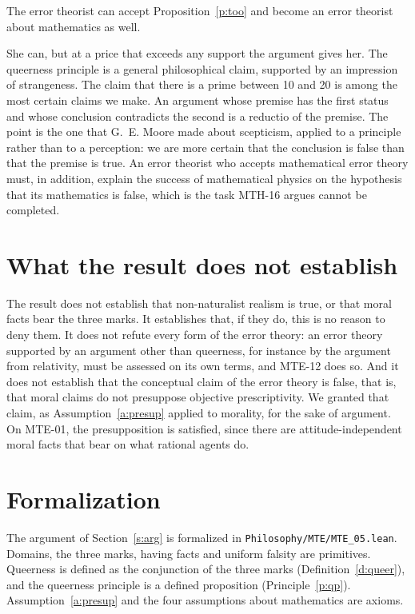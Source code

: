 \documentclass{situationist-preprint}
\begin{document}
\begin{objection}
The error theorist can accept Proposition~\ref{p:too} and become an error theorist about mathematics as well.
\end{objection}

\begin{reply}
She can, but at a price that exceeds any support the argument gives her. The queerness principle is a general philosophical claim, supported by an impression of strangeness. The claim that there is a prime between 10 and 20 is among the most certain claims we make. An argument whose premise has the first status and whose conclusion contradicts the second is a reductio of the premise. The point is the one that G.~E. Moore made about scepticism, applied to a principle rather than to a perception: we are more certain that the conclusion is false than that the premise is true. An error theorist who accepts mathematical error theory must, in addition, explain the success of mathematical physics on the hypothesis that its mathematics is false, which is the task MTH-16 argues cannot be completed.
\end{reply}

\section{What the result does not establish}

The result does not establish that non-naturalist realism is true, or that moral facts bear the three marks. It establishes that, if they do, this is no reason to deny them. It does not refute every form of the error theory: an error theory supported by an argument other than queerness, for instance by the argument from relativity, must be assessed on its own terms, and MTE-12 does so. And it does not establish that the conceptual claim of the error theory is false, that is, that moral claims do not presuppose objective prescriptivity. We granted that claim, as Assumption~\ref{a:presup} applied to morality, for the sake of argument. On MTE-01, the presupposition is satisfied, since there are attitude-independent moral facts that bear on what rational agents do.

\section{Formalization}

The argument of Section~\ref{s:arg} is formalized in \nolinkurl{Philosophy/MTE/MTE_05.lean}. Domains, the three marks, having facts and uniform falsity are primitives. Queerness is defined as the conjunction of the three marks (Definition~\ref{d:queer}), and the queerness principle is a defined proposition (Principle~\ref{p:qp}). Assumption~\ref{a:presup} and the four assumptions about mathematics are axioms.
\end{document}
